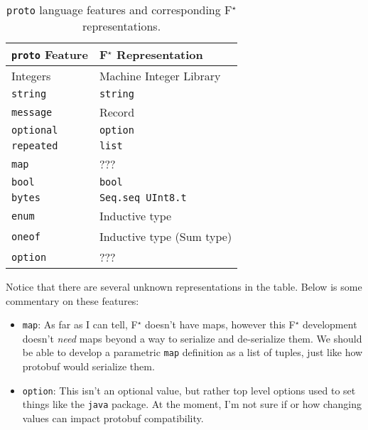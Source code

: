 \documentclass[11pt]{article}
\newcommand{\fstar}{F\(^\star\)}
\theoremstyle{definition}
\begin{document}
\begin{table}[H]
	\centering
	\begin{tabular}{ll}
		\toprule
		\texttt{proto} Feature & \fstar{} Representation   \\
		\midrule
		Integers               & Machine Integer Library   \\
		\texttt{string}        & \texttt{string}           \\
		\texttt{message}       & Record                    \\
		\texttt{optional}      & \texttt{option}           \\
		\texttt{repeated}      & \texttt{list}             \\
		\texttt{map}           & ???                       \\
		\texttt{bool}          & \texttt{bool}             \\
		\texttt{bytes}         & \texttt{Seq.seq UInt8.t}  \\
		\texttt{enum}          & Inductive type            \\
		\texttt{oneof}         & Inductive type (Sum type) \\
		\texttt{option}        & ???                       \\
		\bottomrule
	\end{tabular}

	\vspace{4mm}
	\caption[]{\texttt{proto} language features and corresponding \fstar{} representations.}
\end{table}

Notice that there are several unknown representations in the table. Below is
some commentary on these features:

\begin{itemize}
	\item \texttt{map}: As far as I can tell, \fstar{} doesn't have maps, however
	      this \fstar{} development doesn't \emph{need} maps beyond a way to serialize
	      and de-serialize them. We should be able to develop a parametric
	      \texttt{map} definition as a list of tuples, just like how protobuf would
	      serialize them.
	\item \texttt{option}: This isn't an optional value, but rather top level
	      options used to set things like the \texttt{java} package. At the moment,
	      I'm not sure if or how changing values can impact protobuf compatibility.
\end{itemize}
\end{document}
